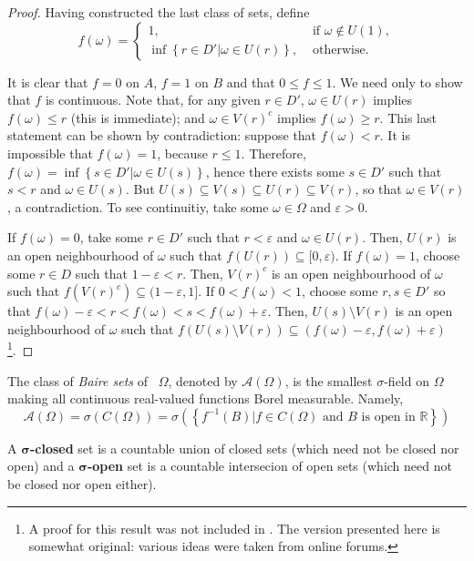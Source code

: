 \begin{proof}
		Having constructed the last class of sets, define 
		\[
				f(\omega)=\left\{
				\begin{array}{ll}
						1, & \text{ if }\omega\not\in U(1),\\
				\inf\left\{r\in D'\left|\omega\in U(r)\right.\right\}, & \text{ otherwise}.
				\end{array}
				\right.
		\]

		It is clear that \(f=0\) on \(A\), \(f=1\) on \(B\) and that \(0\leq f\leq 1\). We need only to show that \(f\) is continuous. Note that, for any given \(r\in D'\), \(\omega\in U(r)\) implies \(f(\omega)\leq r\) (this is immediate); and \(\omega\in V(r)^c\) implies \(f(\omega)\geq r\). This last statement can be shown by contradiction: suppose that \(f(\omega)<r\). It is impossible that \(f(\omega)=1\), because \(r\leq 1\). Therefore, \(f(\omega)=\inf\left\{s\in D'\left|\omega\in U(s)\right.\right\}\), hence there exists some \(s\in D'\) such that \(s<r\) and \(\omega\in U(s)\). But \(U(s)\subseteq V(s)\subseteq U(r)\subseteq V(r)\), so that \(\omega\in V(r)\), a contradiction. To see continuitiy, take some \(\omega\in\Omega\) and \(\varepsilon>0\).

		If \(f(\omega)=0\), take some \(r\in D'\) such that \(r<\varepsilon\) and \(\omega\in U(r)\). Then, \(U(r)\) is an open neighbourhood of \(\omega\) such that \(f\left(U(r)\right)\subseteq[0,\varepsilon)\). If \(f(\omega)=1\), choose some \(r\in D\) such that \(1-\varepsilon<r\). Then, \(V(r)^c\) is an open neighbourhood of \(\omega\) such that \(f\left(V(r)^c\right)\subseteq (1-\varepsilon,1]\).	If \(0<f(\omega)<1\), choose some \(r,s\in D'\) so that \(f(\omega)-\varepsilon<r<f(\omega)<s<f(\omega)+\varepsilon\). Then, \(U(s)\setminus V(r)\) is an open neighbourhood of \(\omega\) such that \(f\left(U(s)\setminus V(r)\right)\subseteq\left(f(\omega)-\varepsilon,f(\omega)+\varepsilon\right)\)\footnote{A proof for this result was not included in \cite{ash1972real}. The version presented here is somewhat original: various ideas were taken from online forums.}.
\end{proof}
\begin{defn}
		The class of \emph{Baire sets} of ~\(\Omega\), denoted by \(\mathcal{A}(\Omega)\), is the smallest \(\sigma\)-field on \(\Omega\) making all continuous real-valued functions Borel measurable. Namely,
\[
\mathcal{A}(\Omega)=\sigma(C(\Omega))=\sigma\left(\left\{f^{-1}(B)\left|f\in C(\Omega) \text{ and }B \text{ is open in }\mathbb{R}\right.\right\}\right)
\]

A \(\bm{\sigma}\)\textbf{-closed} set is a countable union of closed sets (which need not be closed nor open) and a \(\bm{\sigma}\)\textbf{-open} set is a countable intersecion of open sets (which need not be closed nor open either).
\end{defn}

